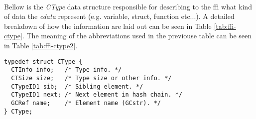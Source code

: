 \\
Bellow is the \emph{CType} data structure responsible for describing to the ffi
what kind of data the \emph{cdata} represent (e.g. variable, struct,
function etc...). A detailed breakdown of how the information are laid out can
be seen in Table \ref{tab:ffi-ctype}. The meaning of the abbreviations used in
the previouse table can be seen in Table \ref{tab:ffi-ctype2}.
\begin{lstlisting}[style=CStyle]
typedef struct CType {
  CTInfo info;   /* Type info. */
  CTSize size;   /* Type size or other info. */
  CTypeID1 sib;  /* Sibling element. */
  CTypeID1 next; /* Next element in hash chain. */
  GCRef name;    /* Element name (GCstr). */
} CType;
\end{lstlisting}

